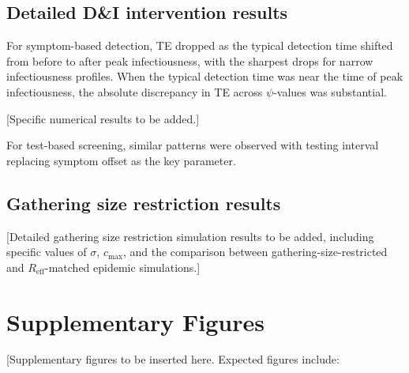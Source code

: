 \documentclass[10pt]{article}
\begin{document}
\subsection{Detailed D\&I intervention results}

For symptom-based detection, TE dropped as the typical detection time shifted from before to after peak infectiousness, with the sharpest drops for narrow infectiousness profiles. When the typical detection time was near the time of peak infectiousness, the absolute discrepancy in TE across $\psi$-values was substantial.

[Specific numerical results to be added.]

For test-based screening, similar patterns were observed with testing interval replacing symptom offset as the key parameter.

\subsection{Gathering size restriction results}

[Detailed gathering size restriction simulation results to be added, including specific values of $\sigma$, $c_\text{max}$, and the comparison between gathering-size-restricted and $R_\text{eff}$-matched epidemic simulations.]


\section{Supplementary Figures}
\label{sec:supp_figures}

[Supplementary figures to be inserted here. Expected figures include:
\end{document}
